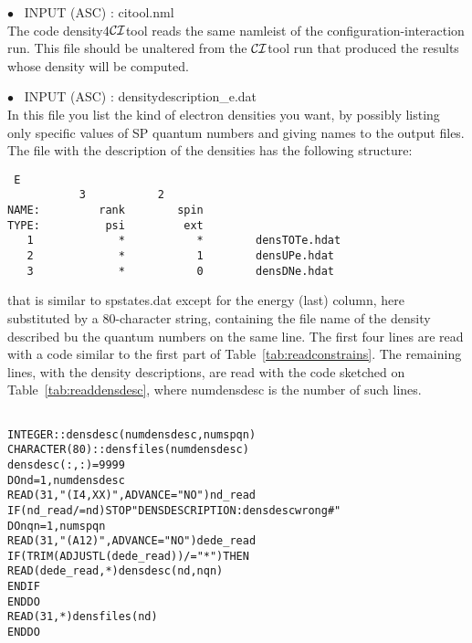 \documentclass[12pt,twoside]{article}
\newcommand*{\CItool}[0]{{$\cal CI$}\textsf{tool} }
\begin{document}
$\bullet$ \ \textsf{INPUT (ASC) : citool.nml} \\ The code
\textsf{density4}\CItool reads the same namleist of the
configuration-interaction run. This file should be unaltered from the
\CItool run that produced the results whose density will be computed.


$\bullet$ \ \textsf{INPUT (ASC) : densitydescription\_e.dat} \\
In this file you list the kind of electron densities you want, by possibly listing
only specific values of SP quantum numbers and giving names to the output files.
The file with the description of the densities has the following structure:
\begin{verbatim}
 E
           3           2
NAME:         rank        spin
TYPE:          psi         ext
   1             *           *        densTOTe.hdat
   2             *           1        densUPe.hdat
   3             *           0        densDNe.hdat
\end{verbatim}
\vspace{2 mm}
that is similar to \textsf{spstates.dat} except for the energy (last) column,
here substituted by a 80-character string, containing the file name of the
density described bu the quantum numbers on the same line.
The first four lines are read with a code similar to the first
part of Table~\ref{tab:readconstrains}. The remaining lines, with the density
descriptions, are read with the code sketched on Table~\ref{tab:readdensdesc}, where
\textsf{numdensdesc} is the number of such lines.
%
\begin{table}
\begin{alltt}
\ \\
INTEGER :: densdesc(numdensdesc,numspqn)
CHARACTER(80) :: densfiles(numdensdesc)
densdesc(:,:)= 9999
DO nd= 1, numdensdesc
  READ(31,"(I4,XX)",ADVANCE="NO") nd_read
  IF ( nd_read /= nd )  STOP "DENSDESCRIPTION: densdesc wrong #"
  DO nqn= 1, numspqn
    READ(31,"(A12)",ADVANCE="NO") dede_read
    IF (TRIM(ADJUSTL(dede_read)) /= "*") THEN
      READ(dede_read,*) densdesc(nd,nqn)
    END IF
  END DO
  READ(31,*) densfiles(nd)
END DO
\end{alltt}
\caption{Scrap of \textsf{density4}\CItool code for reading the density-description
file \textsf{densitydescription\_e.dat}.}
\label{tab:readdensdesc}
\end{table}
\end{document}
